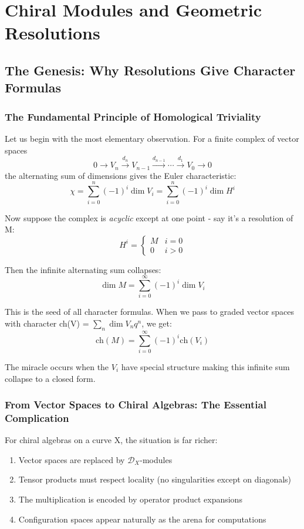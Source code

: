 \chapter{Chiral Modules and Geometric Resolutions}

\section{The Genesis: Why Resolutions Give Character Formulas}

\subsection{The Fundamental Principle of Homological Triviality}

Let us begin with the most elementary observation. For a finite complex of vector spaces
\[
0 \to V_n \xrightarrow{d_n} V_{n-1} \xrightarrow{d_{n-1}} \cdots \xrightarrow{d_1} V_0 \to 0
\]
the alternating sum of dimensions gives the Euler characteristic:
\[
\chi = \sum_{i=0}^n (-1)^i \dim V_i = \sum_{i=0}^n (-1)^i \dim H^i
\]

Now suppose the complex is \emph{acyclic} except at one point - say it's a resolution of M:
\[
H^i = \begin{cases} M & i = 0 \\ 0 & i > 0 \end{cases}
\]

Then the infinite alternating sum collapses:
\[
\dim M = \sum_{i=0}^\infty (-1)^i \dim V_i
\]

This is the seed of all character formulas. When we pass to graded vector spaces with character ch(V) = $\sum_{n} \dim V_n q^n$, we get:
\[
\text{ch}(M) = \sum_{i=0}^\infty (-1)^i \text{ch}(V_i)
\]

The miracle occurs when the $V_i$ have special structure making this infinite sum collapse to a closed form.

\subsection{From Vector Spaces to Chiral Algebras: The Essential Complication}

For chiral algebras on a curve X, the situation is far richer:
\begin{enumerate}
\item Vector spaces are replaced by $\mathcal{D}_X$-modules
\item Tensor products must respect locality (no singularities except on diagonals)  
\item The multiplication is encoded by operator product expansions
\item Configuration spaces appear naturally as the arena for computations
\end{enumerate}

